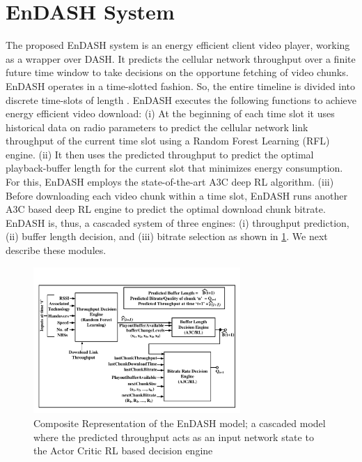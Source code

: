 \section{\textbf{EnDASH System}}\label{sec:chap04:sys_overview}
The proposed EnDASH system is an energy efficient client video player, working as a wrapper over \ac{DASH}. It predicts the cellular network throughput over a finite future time window to take decisions on the opportune fetching of  video chunks.  EnDASH operates in a time-slotted fashion. So, the entire timeline is divided into discrete time-slots of length .
EnDASH executes the following functions to achieve energy efficient video download: (i) At the beginning of each time slot it uses historical data on radio parameters to predict the cellular network link throughput of the current time slot using a Random Forest Learning (RFL) engine. (ii) It then uses the predicted throughput to predict the optimal playback-buffer length for the current slot that minimizes energy consumption. For this, EnDASH employs the state-of-the-art \ac{A3C} deep \ac{RL} algorithm.  (iii) Before downloading each video chunk within a time slot, EnDASH runs another A3C based deep \ac{RL} engine to predict the optimal download chunk  bitrate. 
EnDASH is, thus, a cascaded system of three engines: (i) throughput prediction, (ii) buffer length decision,  and (iii) bitrate selection as shown in \fig\ref{fig:chap04:EnDASH system}. We next describe these modules.
 \begin{figure}[t]
	\centering
	\includegraphics[width = 0.7\textwidth,trim = {1cm 1cm 1cm 1cm}]{figures/EnDASH_system.pdf}
	\caption{Composite Representation of the EnDASH model; a cascaded model where the predicted throughput acts as an input network state to the Actor Critic \ac{RL} based decision engine}
	\label{fig:chap04:EnDASH system}
\end{figure}

